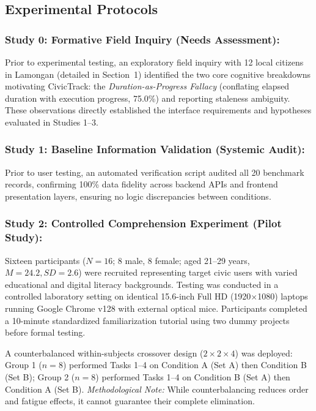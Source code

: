 \documentclass[runningheads]{llncs}
\begin{document}
\subsection{Experimental Protocols}

\subsubsection{Study 0: Formative Field Inquiry (Needs Assessment):}
Prior to experimental testing, an exploratory field inquiry with 12 local citizens in Lamongan (detailed in Section~1) identified the two core cognitive breakdowns motivating CivicTrack: the \emph{Duration-as-Progress Fallacy} (conflating elapsed duration with execution progress, 75.0\%) and reporting staleness ambiguity. These observations directly established the interface requirements and hypotheses evaluated in Studies 1--3.

\subsubsection{Study 1: Baseline Information Validation (Systemic Audit):}
Prior to user testing, an automated verification script audited all 20 benchmark records, confirming 100\% data fidelity across backend APIs and frontend presentation layers, ensuring no logic discrepancies between conditions.

\subsubsection{Study 2: Controlled Comprehension Experiment (Pilot Study):}
Sixteen participants ($N = 16$; 8 male, 8 female; aged 21--29 years, $M = 24.2, SD = 2.6$) were recruited representing target civic users with varied educational and digital literacy backgrounds. Testing was conducted in a controlled laboratory setting on identical 15.6-inch Full HD (1920$\times$1080) laptops running Google Chrome v128 with external optical mice. Participants completed a 10-minute standardized familiarization tutorial using two dummy projects before formal testing.

A counterbalanced within-subjects crossover design ($2 \times 2 \times 4$) was deployed: Group 1 ($n=8$) performed Tasks 1--4 on Condition A (Set A) then Condition B (Set B); Group 2 ($n=8$) performed Tasks 1--4 on Condition B (Set A) then Condition A (Set B). \emph{Methodological Note:} While counterbalancing reduces order and fatigue effects, it cannot guarantee their complete elimination.
\end{document}
